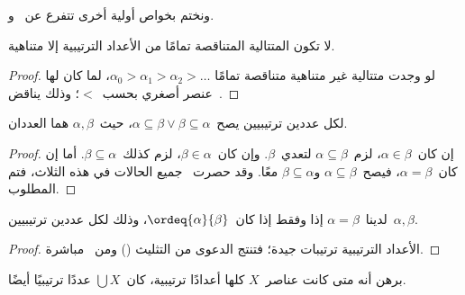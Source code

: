\documentclass[../../../include/open-logic-section]{subfiles}
\begin{document}
ونختم بخواص أولية أخرى تتفرع عن~
و.

\begin{prop}
لا تكون المتتالية المتناقصة تمامًا من الأعداد الترتيبية إلا متناهية.
\end{prop}

\begin{proof}
لو وجدت متتالية غير متناهية متناقصة تمامًا
$\alpha_0 > \alpha_1 > \alpha_2 > \ldots$، لما كان لها عنصر أصغري
بحسب~$<$؛ وذلك يناقض~.
\end{proof}

\begin{prop}
لكل عددين ترتيبيين يصح~$\alpha \subseteq \beta \lor \beta \subseteq \alpha$،
حيث~$\alpha, \beta$ هما العددان.
\end{prop}

\begin{proof}
إن كان~$\alpha \in \beta$، لزم~$\alpha \subseteq \beta$ لتعدي~$\beta$.
وإن كان~$\beta \in \alpha$، لزم كذلك~$\beta \subseteq \alpha$.
أما إن كان~$\alpha = \beta$، فيصح~$\alpha \subseteq \beta$
و$\beta \subseteq \alpha$ معًا. وقد حصرت~
جميع الحالات في هذه الثلاث، فتم المطلوب.
\end{proof}

\begin{prop}
لدينا~$\alpha = \beta$ إذا وفقط إذا كان~$\ordeq{\alpha}{\beta}$،
وذلك لكل عددين ترتيبيين~$\alpha, \beta$.
\end{prop}

\begin{proof}
الأعداد الترتيبية ترتيبات جيدة؛ فتنتج الدعوى من التثليث
() ومن~ مباشرة.
\end{proof}

\begin{prob}
برهن أنه متى كانت عناصر~$X$ كلها أعدادًا ترتيبية، كان~$\bigcup X$
عددًا ترتيبيًا أيضًا.
\end{prob}
\end{document}
